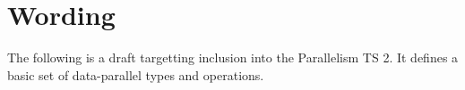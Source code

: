 \section{Wording}

The following is a draft targetting inclusion into the Parallelism TS 2.
It defines a basic set of data-parallel types and operations.

\begin{wgText}
  
  
  
\end{wgText}
